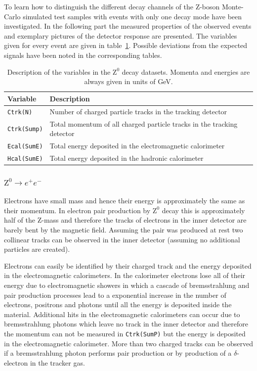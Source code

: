 \documentclass[11pt, a4paper]{article}
\numberwithin{equation}{section}
\begin{document}
To learn how to distinguish the different decay channels of the Z-boson Monte-Carlo simulated test samples with events with only one decay mode have been investigated.
In the following part the measured properties of the observed events and exemplary pictures of the detector response are presented.
The variables given for every event are given in table~\ref{tab:desc_variables_tag1}.
Possible deviations from the expected signals have been noted in the corresponding tables.
\begin{table}[H]
	\centering
	\begin{tabularx}{0.9\textwidth}{lX}
		\toprule
		\textbf{Variable} & \textbf{Description} \\
		\midrule		
		\texttt{Ctrk(N)} 	& Number of charged particle tracks in the tracking detector \\
		\texttt{Ctrk(Sump)} 	& Total momentum of all charged particle tracks in the tracking detector \\
		\texttt{Ecal(SumE)}	& Total energy deposited in the electromagnetic calorimeter \\
		\texttt{Hcal(SumE)}	& Total energy deposited in the hadronic calorimeter \\
		\bottomrule
	\end{tabularx}
	\caption{Description of the variables in the $\mathrm{Z}^0$ decay datasets. Momenta and energies are always given in units of GeV.}
	\label{tab:desc_variables_tag1}
\end{table}

\clearpage
\subsubsection{$\mathrm{Z}^0\rightarrow e^+e^-$}
Electrons have small mass and hence their energy is approximately the same as their momentum.
In electron pair production by $\mathrm{Z}^0$ decay this is approximately half of the Z-mass and therefore the tracks of electrons in the inner detector are barely bent by the magnetic field.
Assuming the pair was produced at rest two collinear tracks can be observed in the inner detector (assuming no additional particles are created).

Electrons can easily be identified by their charged track and the energy deposited in the electromagnetic calorimeters.
In the calorimeter electrons lose all of their energy due to electromagnetic showers in which a cascade of bremsstrahlung and pair production processes lead to a exponential increase in the number of electrons, positrons and photons until all the energy is deposited inside the material.
Additional hits in the electromagnetic calorimeters can occur due to bremsstrahlung photons which leave no track in the inner detector and therefore the momentum can not be measured in \texttt{Ctrk(SumP)} but the energy is deposited in the electromagnetic calorimeter.
More than two charged tracks can be observed if a bremsstrahlung photon performs pair production or by production of a $\delta$-electron in the tracker gas.
\end{document}
